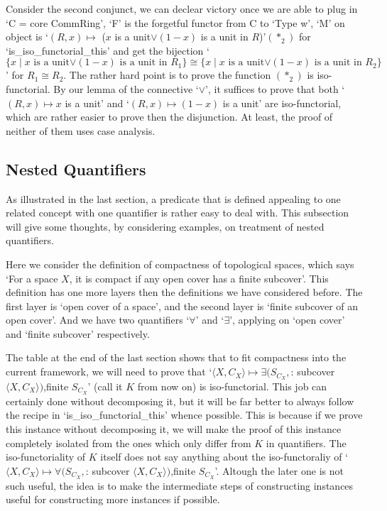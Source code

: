 \documentclass[11pt]{article}
\begin{document}
Consider the second conjunct, we can declear victory once we are able to plug in `C = core CommRing', `F' is the forgetful functor from C to `Type w', `M' on object is `$(R,x)\mapsto$ ($x$ is a unit$\lor (1-x)$ is a unit in $R$)'$(*_2)$ for `is\_iso\_functorial\_this' and get the bijection `$\{x \mid \text{$x$ is a unit$\lor (1-x)$ is a unit in $R_1$}\} \cong \{x \mid \text{$x$ is a unit$\lor (1-x)$ is a unit in $R_2$}\}$' for $R_1\cong R_2$. The rather hard point is to prove the function $(*_2)$ is iso-functorial. By our lemma of the connective `$\lor$', it suffices to prove that both `$(R,x)\mapsto x$ is a unit' and `$(R,x)\mapsto (1-x)$ is a unit' are iso-functorial, which are rather easier to prove then the disjunction. At least, the proof of neither of them uses case analysis.


\subsection{Nested Quantifiers}

As illustrated in the last section, a predicate that is defined appealing to one related concept with one quantifier is rather easy to deal with. This subsection will give some thoughts, by considering examples, on treatment of nested quantifiers.

Here we consider the definition of compactness of topological spaces, which says `For a space $X$, it is compact if any open cover has a finite subcover'. This definition has one more layers then the definitions we have considered before. The first layer is `open cover of a space', and the second layer is `finite subcover of an open cover'. And we have two quantifiers `$\forall$' and `$\exists$', applying on `open cover' and `finite subcover' respectively.

The table at the end of the last section shows that to fit compactness into the current framework, we will need to prove that `$\langle X,C_X\rangle \mapsto\exists (S_{C_X},$: subcover $\langle X,C_X\rangle)$,finite $S_{C_X}$' (call it $K$ from now on) is iso-functorial. This job can certainly done without decomposing it, but it will be far better to always follow the recipe in `is\_iso\_functorial\_this' whence possible. This is because if we prove this instance without decomposing it, we will make the proof of this instance completely isolated from the ones which only differ from $K$ in quantifiers. The iso-functoriality of $K$ itself does not say anything about the iso-functoraliy of `$\langle X,C_X\rangle \mapsto\forall (S_{C_X},$: subcover $\langle X,C_X\rangle)$,finite $S_{C_X}$'. Altough the later one is not such useful, the idea is to make the intermediate steps of constructing instances useful for constructing more instances if possible.
\end{document}
